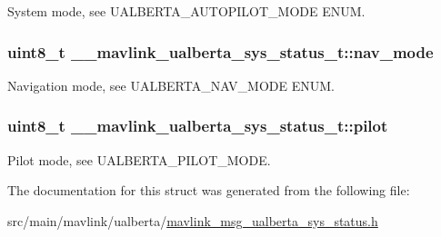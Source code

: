 System mode, see U\+A\+L\+B\+E\+R\+T\+A\+\_\+\+A\+U\+T\+O\+P\+I\+L\+O\+T\+\_\+\+M\+O\+D\+E E\+N\+U\+M. 

\hypertarget{struct____mavlink__ualberta__sys__status__t_a1c76bf629b8d711beea2541286d10235}{
\subsubsection[{nav\+\_\+mode}]{\setlength{\rightskip}{0pt plus 5cm}uint8\+\_\+t \+\_\+\+\_\+mavlink\+\_\+ualberta\+\_\+sys\+\_\+status\+\_\+t\+::nav\+\_\+mode}}\label{struct____mavlink__ualberta__sys__status__t_a1c76bf629b8d711beea2541286d10235}


Navigation mode, see U\+A\+L\+B\+E\+R\+T\+A\+\_\+\+N\+A\+V\+\_\+\+M\+O\+D\+E E\+N\+U\+M. 

\hypertarget{struct____mavlink__ualberta__sys__status__t_acfcd37f09994c3b0f1da60822e57cd05}{
\subsubsection[{pilot}]{\setlength{\rightskip}{0pt plus 5cm}uint8\+\_\+t \+\_\+\+\_\+mavlink\+\_\+ualberta\+\_\+sys\+\_\+status\+\_\+t\+::pilot}}\label{struct____mavlink__ualberta__sys__status__t_acfcd37f09994c3b0f1da60822e57cd05}


Pilot mode, see U\+A\+L\+B\+E\+R\+T\+A\+\_\+\+P\+I\+L\+O\+T\+\_\+\+M\+O\+D\+E. 



The documentation for this struct was generated from the following file\+:\begin{DoxyCompactItemize}
\item 
src/main/mavlink/ualberta/\hyperlink{mavlink__msg__ualberta__sys__status_8h}{mavlink\+\_\+msg\+\_\+ualberta\+\_\+sys\+\_\+status.\+h}\end{DoxyCompactItemize}
